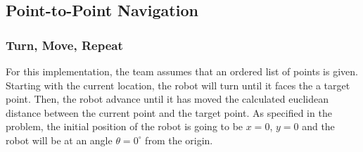 \documentclass[12pt,conference,onecolumn]{IEEEtran} %
\begin{document}
\subsection{Point-to-Point Navigation}

\subsubsection{Turn, Move, Repeat}
For this implementation, the team assumes that an ordered list of points is given. Starting with the current location, the robot will turn until it faces the a target point. Then, the robot advance until it has moved the calculated euclidean distance between the current point and the target point. As specified in the problem, the initial position of the robot is going to be $x=0$, $y=0$ and the robot will be at an angle $\theta=0^{\circ}$ from the origin.

\end{document}
